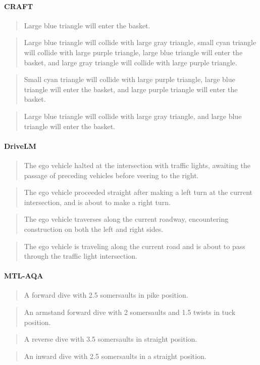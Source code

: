 \documentclass[11pt]{article}
\begin{document}
\paragraph{CRAFT}
\begin{quote}
Large blue triangle will enter the basket.
\end{quote}
\begin{quote}
Large blue triangle will collide with large gray triangle, small cyan triangle will collide with large purple triangle, large blue triangle will enter the basket, and large gray triangle will collide with large purple triangle.
\end{quote}
\begin{quote}
Small cyan triangle will collide with large purple triangle, large blue triangle will enter the basket, and large purple triangle will enter the basket.
\end{quote}
\begin{quote}
Large blue triangle will collide with large gray triangle, and large blue triangle will enter the basket.
\end{quote}

\paragraph{DriveLM}
\begin{quote}
The ego vehicle halted at the intersection with traffic lights, awaiting the passage of preceding vehicles before
  veering to the right.
\end{quote}
\begin{quote}
The ego vehicle proceeded straight after making a left turn at the current intersection, and is about to make a right turn.
\end{quote}
\begin{quote}
The ego vehicle traverses along the current roadway, encountering construction on both the left and right sides.
\end{quote}
\begin{quote}
The ego vehicle is traveling along the current road and is about to pass through the traffic light intersection.
\end{quote}

\paragraph{MTL-AQA}
\begin{quote}
A forward dive with 2.5 somersaults in pike position.
\end{quote}
\begin{quote}
An armstand forward dive with 2 somersaults and 1.5 twists in tuck position.
\end{quote}
\begin{quote}
A reverse dive with 3.5 somersaults in straight position.
\end{quote}
\begin{quote}
An inward dive with 2.5 somersaults in a straight position.
\end{quote}
\end{document}
